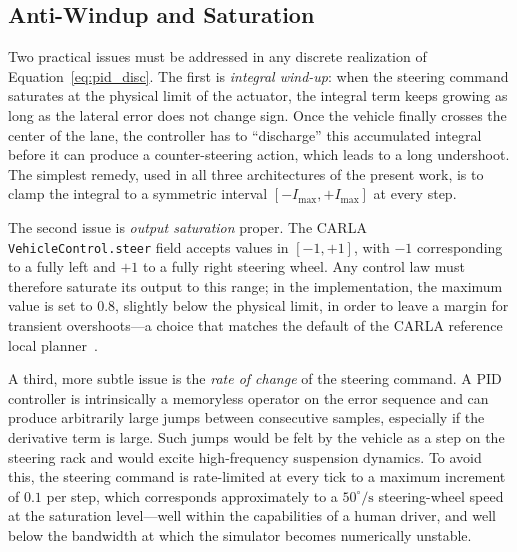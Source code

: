 \subsection{Anti-Windup and Saturation}
Two practical issues must be addressed in any discrete realization of Equation~\eqref{eq:pid_disc}. The first is \emph{integral wind-up}: when the steering command saturates at the physical limit of the actuator, the integral term keeps growing as long as the lateral error does not change sign. Once the vehicle finally crosses the center of the lane, the controller has to \enquote{discharge} this accumulated integral before it can produce a counter-steering action, which leads to a long undershoot. The simplest remedy, used in all three architectures of the present work, is to clamp the integral to a symmetric interval $[-I_{\max}, +I_{\max}]$ at every step.

The second issue is \emph{output saturation} proper. The CARLA \texttt{VehicleControl.steer} field accepts values in \([-1, +1]\), with \(-1\) corresponding to a fully left and \(+1\) to a fully right steering wheel. Any control law must therefore saturate its output to this range; in the implementation, the maximum value is set to \(0.8\), slightly below the physical limit, in order to leave a margin for transient overshoots---a choice that matches the default of the CARLA reference local planner~\cite{local_planner}.

A third, more subtle issue is the \emph{rate of change} of the steering command. A PID controller is intrinsically a memoryless operator on the error sequence and can produce arbitrarily large jumps between consecutive samples, especially if the derivative term is large. Such jumps would be felt by the vehicle as a step on the steering rack and would excite high-frequency suspension dynamics. To avoid this, the steering command is rate-limited at every tick to a maximum increment of $0.1$ per step, which corresponds approximately to a $50^\circ\text{/s}$ steering-wheel speed at the saturation level---well within the capabilities of a human driver, and well below the bandwidth at which the simulator becomes numerically unstable.


